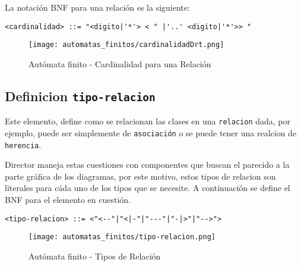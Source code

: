 La notación BNF para una relación es la siguiente:

\begin{lstlisting}[caption={BNF - Cardinalidad para una Relación},basicstyle=\footnotesize\ttfamily]
	<cardinalidad> ::= "<digito|'*'> < " |'..' <digito|'*'>> "
\end{lstlisting}

\begin{figure}[H]
	\centering
	\texttt{[image: automatas\_finitos/cardinalidadDrt.png]}
	\caption{Autómata finito - Cardinalidad para una Relación}
	\label{fig:af_relacion_cardinalidad}
\end{figure}

\subsection*{Definicion \texttt{tipo-relacion}}
\label{sub:tiporelacion}

Este elemento, define como se relacionan las clases en una \texttt{relacion}
dada, por ejemplo, puede ser simplemente de \texttt{asociación} o se puede
tener una realcion de \texttt{herencia}.

Director maneja estas cuestiones con componentes que buscan el parecido a la
parte gráfica de los diagramas, por este motivo, estos tipos de relacion son
literales para cáda uno de los tipos que se necesite. A continuación se define
el BNF para el elemento en cuestión.

\begin{lstlisting}[caption={BNF - Tipos de Relación}, basicstyle=\footnotesize\ttfamily]
	<tipo-relacion> ::= <"<--"|"<|-"|"---"|"-|>"|"-->">
\end{lstlisting}

\begin{figure}[H]
	\centering
	\texttt{[image: automatas\_finitos/tipo-relacion.png]}
	\caption{Autómata finito - Tipos de Relación}
	\label{fig:af_tipos_relaciones}
\end{figure}
